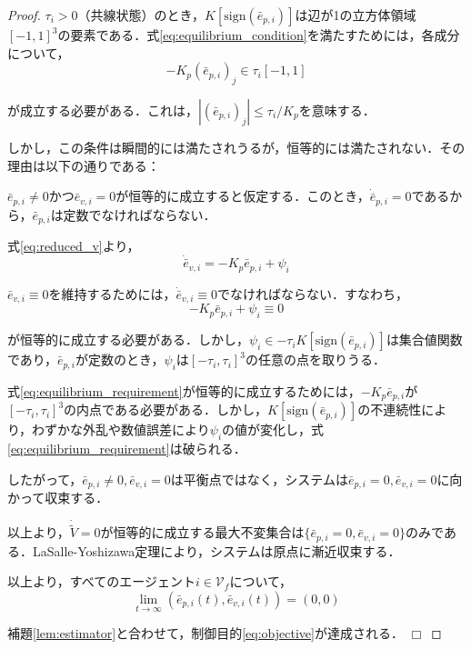 \documentclass[a4paper]{jarticle}
\def\qed{\hfill $\Box$}
\theoremstyle{definition}
\theoremstyle{remark}
\numberwithin{equation}{section}
\begin{document}
\begin{proof}
		$\tau_i > 0$（共線状態）のとき，$K[\mathrm{sign}(\bar{e}_{p,i})]$は辺が1の立方体領域$[-1,1]^3$の要素である．式\eqref{eq:equilibrium_condition}を満たすためには，各成分について，
		\begin{equation}
			-K_p (\bar{e}_{p,i})_j \in \tau_i [-1, 1]
			\label{eq:component_condition}
		\end{equation}
		
		が成立する必要がある．これは，$|(\bar{e}_{p,i})_j| \le \tau_i / K_p$を意味する．
		
		しかし，この条件は瞬間的には満たされうるが，恒等的には満たされない．その理由は以下の通りである：
		
		$\bar{e}_{p,i} \neq 0$かつ$\bar{e}_{v,i} = 0$が恒等的に成立すると仮定する．このとき，$\dot{\bar{e}}_{p,i} = 0$であるから，$\bar{e}_{p,i}$は定数でなければならない．
		
		式\eqref{eq:reduced_v}より，
		\begin{equation}
			\dot{\bar{e}}_{v,i} = -K_p \bar{e}_{p,i} + \psi_i
		\end{equation}
		
		$\bar{e}_{v,i} \equiv 0$を維持するためには，$\dot{\bar{e}}_{v,i} \equiv 0$でなければならない．すなわち，
		\begin{equation}
			-K_p \bar{e}_{p,i} + \psi_i \equiv 0
			\label{eq:equilibrium_requirement}
		\end{equation}
		
		が恒等的に成立する必要がある．しかし，$\psi_i \in -\tau_i K[\mathrm{sign}(\bar{e}_{p,i})]$は集合値関数であり，$\bar{e}_{p,i}$が定数のとき，$\psi_i$は$[-\tau_i, \tau_i]^3$の任意の点を取りうる．
		
		式\eqref{eq:equilibrium_requirement}が恒等的に成立するためには，$-K_p \bar{e}_{p,i}$が$[-\tau_i, \tau_i]^3$の内点である必要がある．しかし，$K[\mathrm{sign}(\bar{e}_{p,i})]$の不連続性により，わずかな外乱や数値誤差により$\psi_i$の値が変化し，式\eqref{eq:equilibrium_requirement}は破られる．
		
		したがって，$\bar{e}_{p,i} \neq 0, \bar{e}_{v,i} = 0$は平衡点ではなく，システムは$\bar{e}_{p,i} = 0, \bar{e}_{v,i} = 0$に向かって収束する．
		
		以上より，$\dot{\tilde{V}} = 0$が恒等的に成立する最大不変集合は$\{\bar{e}_{p,i} = 0, \bar{e}_{v,i} = 0\}$のみである．LaSalle-Yoshizawa定理\cite{yoshi}により，システムは原点に漸近収束する．
		
		以上より，すべてのエージェント$i \in \mathcal{V}_f$について，
		\begin{equation}
			\lim_{t \to \infty} (\bar{e}_{p,i}(t), \bar{e}_{v,i}(t)) = (0, 0)
			\label{eq:tracking_convergence}
		\end{equation}
		
		補題\ref{lem:estimator}と合わせて，制御目的\eqref{eq:objective}が達成される． \qed
	\end{proof}
	
\end{document}
